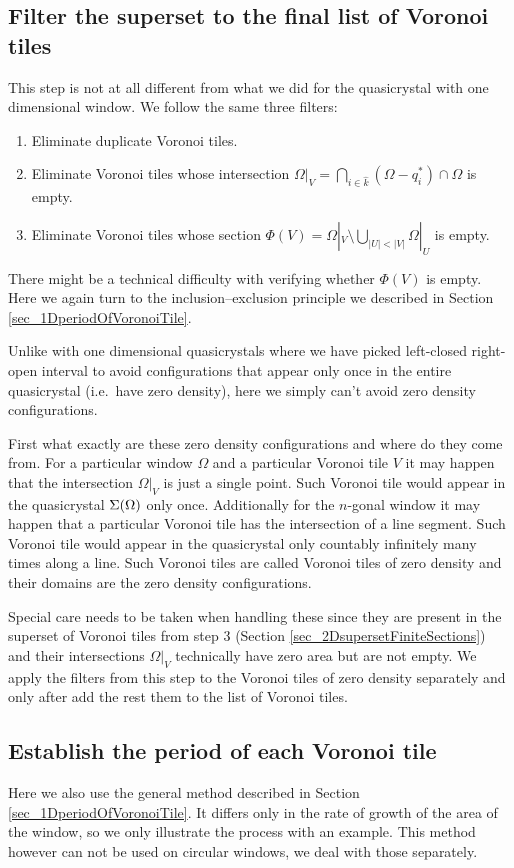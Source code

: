 \documentclass[text.tex]{subfiles}
\begin{document}
\subsection{Filter the superset to the final list of Voronoi tiles}
This step is not at all different from what we did for the quasicrystal with one dimensional window. We follow the same three filters: 
\begin{enumerate}
\item Eliminate duplicate Voronoi tiles. 
\item Eliminate Voronoi tiles whose intersection $\Omega|_{V} = \bigcap\limits_{i\in\hat{k}}(\Omega-q_i^\ast)\cap\Omega$ is empty. 
\item Eliminate Voronoi tiles whose section $\Phi(V) = \Omega|_{V}\setminus\bigcup_{|U|<|V|}\Omega|_{U}$ is empty. 
\end{enumerate}

There might be a technical difficulty with verifying whether $\Phi(V)$ is empty. Here we again turn to the inclusion--exclusion principle we described in Section \ref{sec_1DperiodOfVoronoiTile}. 

Unlike with one dimensional quasicrystals where we have picked left-closed right-open interval to avoid configurations that appear only once in the entire quasicrystal (i.e.\ have zero density), here we simply can't avoid zero density configurations. 

First what exactly are these zero density configurations and where do they come from. For a particular window $\Omega$ and a particular Voronoi tile $V$ it may happen that the intersection $\Omega|_V$ is just a single point. Such Voronoi tile would appear in the quasicrystal $\Sigma(\Omega)$ only once. Additionally for the $n$-gonal window it may happen that a particular Voronoi tile has the intersection of a line segment. Such Voronoi tile would appear in the quasicrystal only countably infinitely many times along a line. Such Voronoi tiles are called Voronoi tiles of zero density and their domains are the zero density configurations. 

Special care needs to be taken when handling these since they are present in the superset of Voronoi tiles from step 3 (Section \ref{sec_2DsupersetFiniteSections}) and their intersections $\Omega|_V$ technically have zero area but are not empty. We apply the filters from this step to the Voronoi tiles of zero density separately and only after add the rest them to the list of Voronoi tiles. 

\subsection{Establish the period of each Voronoi tile}
Here we also use the general method described in Section \ref{sec_1DperiodOfVoronoiTile}. It differs only in the rate of growth of the area of the window, so we only illustrate the process with an example. This method however can not be used on circular windows, we deal with those separately. 
\end{document}
